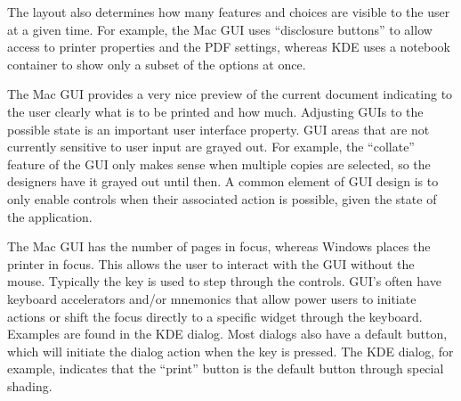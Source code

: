 The layout also determines how many features and choices are visible to the
user at a given time.  For example, the Mac GUI uses ``disclosure
buttons'' to allow access to printer properties and the PDF settings,
whereas KDE uses a notebook container to show only a subset of the
options at once.

The Mac GUI provides a very nice preview of the current document
indicating to the user clearly what is to be printed and how
much. Adjusting GUIs to the possible state is an important user
interface property.  GUI areas that are not currently sensitive to
user input are grayed out. For example, the ``collate'' feature of the
GUI only makes sense when multiple copies are selected, so the
designers have it grayed out until then. A common element of GUI
design is to only enable controls when their associated action is
possible, given the state of the application.

 
The Mac GUI has the number of pages in focus, whereas Windows places
the printer in focus. This allows the user to interact with the GUI
without the mouse. Typically the  key is used to step through
the controls. GUI's often have keyboard accelerators and/or mnemonics that allow power
users to initiate actions or shift the focus directly to a specific
widget through the keyboard. Examples are
found in the KDE dialog. Most dialogs also have a default button, which will
initiate the dialog action when the  key is pressed. The
KDE dialog, for example, indicates that the ``print'' button is the
default button through special shading.




